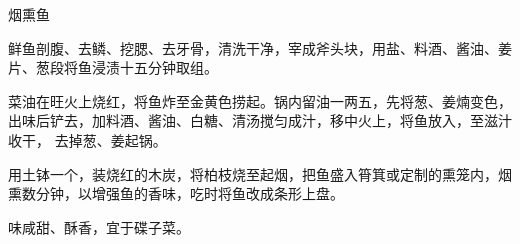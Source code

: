 %
%
%
%
%
%
%
\begin{recipe}{烟熏鱼}

\ingredients


\preparation

\step 鲜鱼剖腹、去鳞、挖腮、去牙骨，清洗干净，宰成斧头块，用盐、料酒、酱油、姜
片、葱段将鱼浸渍十五分钟取组。

\step 菜油在旺火上烧红，将鱼炸至金黄色捞起。锅内留油一两五，先将葱、姜煵变色，
出味后铲去，加料酒、酱油、白糖、清汤搅匀成汁，移中火上，将鱼放入，至滋汁收干，
去掉葱、姜起锅。

\step 用土钵一个，装烧红的木炭，将柏枝烧至起烟，把鱼盛入筲箕或定制的熏笼内，烟
熏数分钟，以增强鱼的香味，吃时将鱼改成条形上盘。

\features

味咸甜、酥香，宜于碟子菜。

\end{recipe}

